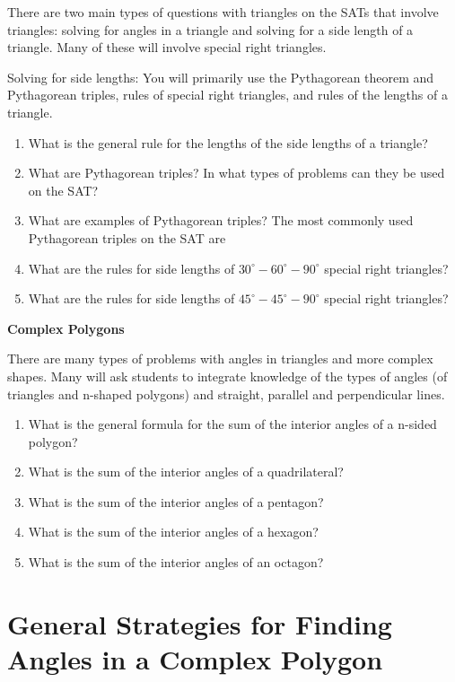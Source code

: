 \hrulefill

There are two main types of questions with triangles on the SATs that involve triangles: solving for angles in a triangle and solving for a side length of a triangle. Many of these will involve special right triangles.

\bigskip
Solving for side lengths: You will primarily use the Pythagorean theorem and Pythagorean triples, rules of special right triangles, and rules of the lengths of a triangle. 

\bigskip
\begin{enumerate}[label=\arabic*)]
\item What is the general rule for the lengths of the side lengths of a triangle?
\vfill\item What are Pythagorean triples? In what types of problems can they be used on the SAT?
\vfill\item What are examples of Pythagorean triples? The most commonly used Pythagorean triples on the SAT are \longline
\vfill\item What are the rules for side lengths of $30^\circ-60^\circ-90^\circ$ special right triangles?
\vfill\item What are the rules for side lengths of $45^\circ-45^\circ-90^\circ$ special right triangles?
\end{enumerate}

\vfill
\newpage
\textbf{\large Complex Polygons}

There are many types of problems with angles in triangles and more complex shapes. Many will ask students to integrate knowledge of the types of angles (of triangles and n-shaped polygons) and straight, parallel and perpendicular lines. 

\bigskip
\begin{enumerate}[label=\arabic*)]
\item What is the general formula for the sum of the interior angles of a n-sided polygon?
\vfill\item What is the sum of the interior angles of a quadrilateral?
\vfill\item What is the sum of the interior angles of a pentagon?
\vfill\item What is the sum of the interior angles of a hexagon?
\vfill\item What is the sum of the interior angles of an octagon?
\end{enumerate}

\vfill
\section[Complex Polygons]{General Strategies for Finding Angles in a Complex Polygon}

